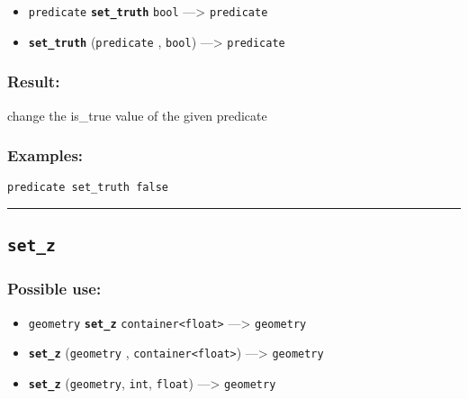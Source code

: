 \documentclass[]{book}
\providecommand{\tightlist}{%
  \setlength{\itemsep}{0pt}\setlength{\parskip}{0pt}}
\theoremstyle{definition}
\theoremstyle{definition}
\theoremstyle{definition}
\theoremstyle{remark}
\begin{document}
\begin{itemize}
\tightlist
\item
  \texttt{predicate} \textbf{\texttt{set\_truth}} \texttt{bool}
  ---\textgreater{} \texttt{predicate}
\item
  \textbf{\texttt{set\_truth}} (\texttt{predicate} , \texttt{bool})
  ---\textgreater{} \texttt{predicate}
\end{itemize}

\subsubsection{Result:}\label{result-452}

change the is\_true value of the given predicate

\subsubsection{Examples:}\label{examples-325}

\begin{verbatim}
predicate set_truth false 
\end{verbatim}

\begin{center}\rule{0.5\linewidth}{\linethickness}\end{center}

\subsection{\texorpdfstring{\texttt{set\_z}}{set\_z}}\label{set_z}

\subsubsection{Possible use:}\label{possible-use-469}

\begin{itemize}
\tightlist
\item
  \texttt{geometry} \textbf{\texttt{set\_z}}
  \texttt{container\textless{}float\textgreater{}} ---\textgreater{}
  \texttt{geometry}
\item
  \textbf{\texttt{set\_z}} (\texttt{geometry} ,
  \texttt{container\textless{}float\textgreater{}}) ---\textgreater{}
  \texttt{geometry}
\item
  \textbf{\texttt{set\_z}} (\texttt{geometry}, \texttt{int},
  \texttt{float}) ---\textgreater{} \texttt{geometry}
\end{itemize}
\end{document}
